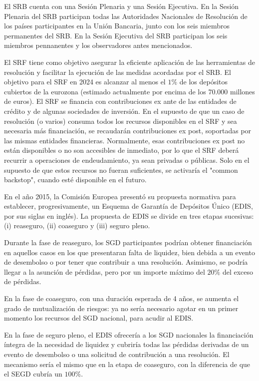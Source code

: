 \documentclass[10pt,a4paper]{article}
\begin{document}
{{    El SRB cuenta con una Sesión Plenaria y una Sesión Ejecutiva. En la Sesión Plenaria del SRB participan todas las Autoridades Nacionales de Resolución de los países participantes en la Unión Bancaria, junto con los seis miembros permanentes del SRB. En la Sesión Ejecutiva del SRB participan los seis miembros pennanentes y los observadores antes mencionados. 
    
    El SRF tiene como objetivo asegurar la eficiente aplicación de las herramientas de resolución y facilitar la ejecución de las medidas acordadas por el SRB. El objetivo para el SRF en 2024 es alcanzar al menos el $1\%$ de los depósitos cubiertos de la eurozona (estimado actualmente por encima de los 70.000 millones de euros). El SRF se financia con contribuciones ex ante de las entidades de crédito y de algunas sociedades de inversión. En el supuesto de que un caso de resolución (o varios) consuma todos los recursos disponibles en el SRF y sea necesaria más financiación, se recaudarán contribuciones ex post, soportadas por las mismas entidades financieras. Normalmente, esas contribuciones ex post no están disponibles o no son accesibles de inmediato, por lo que el SRF deberá recurrir a operaciones de endeudamiento, ya sean privadas o públicas. Solo en el supuesto de que estos recursos no fueran suficientes, se activaría el "common backstop", cuando esté disponible en el futuro.

    En el año 2015, la Comisión Europea presentó su propuesta normativa para establecer, progresivamente, un Esquema de Garantía de Depósitos Único (EDIS, por sus siglas en inglés). La propuesta de EDIS se divide en tres etapas sucesivas: (i) reaseguro, (ii) coaseguro y (iii) seguro pleno. 
    
    Durante la fase de reaseguro, los SGD participantes podrían obtener financiación en aquellos casos en los que presentaran falta de liquidez, bien debida a un evento de desembolso o por tener que contribuir a una resolución. Asimismo, se podría llegar a la asunción de pérdidas, pero por un importe máximo del $20\%$ del exceso de pérdidas. 
    
    En la fase de coaseguro, con una duración esperada de 4 años, se aumenta el grado de mutualización de riesgos: ya no sería necesario agotar en un primer momento los recursos del SGD nacional, para acudir al EDIS.
    
    En la fase de seguro pleno, el EDIS ofrecería a los SGD nacionales la financiación íntegra de la necesidad de liquidez y cubriría todas las pérdidas derivadas de un evento de desembolso o una solicitud de contribución a una resolución. El mecanismo sería el mismo que en la etapa de coaseguro, con la diferencia de que el SEGD cubría un $100\%$. 
    
}}
\end{document}
